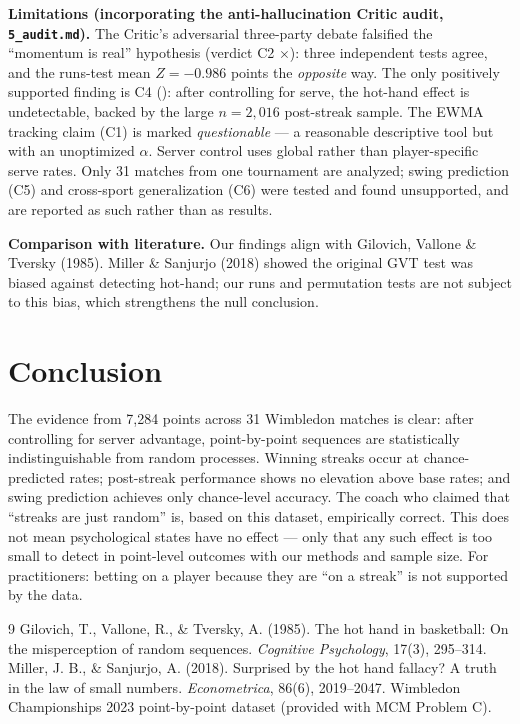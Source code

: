 \documentclass[11pt,a4paper]{article}
\begin{document}
\textbf{Limitations (incorporating the anti-hallucination Critic audit, \texttt{5\_audit.md}).} The Critic's adversarial three-party debate falsified the ``momentum is real'' hypothesis (verdict C2 \(\boldsymbol{\times}\)): three independent tests agree, and the runs-test mean $Z = -0.986$ points the \emph{opposite} way. The only positively supported finding is C4 (\checkmark): after controlling for serve, the hot-hand effect is undetectable, backed by the large $n=2{,}016$ post-streak sample. The EWMA tracking claim (C1) is marked \emph{questionable} --- a reasonable descriptive tool but with an unoptimized $\alpha$. Server control uses global rather than player-specific serve rates. Only 31 matches from one tournament are analyzed; swing prediction (C5) and cross-sport generalization (C6) were tested and found unsupported, and are reported as such rather than as results.

\textbf{Comparison with literature.} Our findings align with Gilovich, Vallone \& Tversky (1985). Miller \& Sanjurjo (2018) showed the original GVT test was biased against detecting hot-hand; our runs and permutation tests are not subject to this bias, which strengthens the null conclusion.

\section{Conclusion}
The evidence from 7{,}284 points across 31 Wimbledon matches is clear: after controlling for server advantage, point-by-point sequences are statistically indistinguishable from random processes. Winning streaks occur at chance-predicted rates; post-streak performance shows no elevation above base rates; and swing prediction achieves only chance-level accuracy. The coach who claimed that ``streaks are just random'' is, based on this dataset, empirically correct. This does not mean psychological states have no effect --- only that any such effect is too small to detect in point-level outcomes with our methods and sample size. For practitioners: betting on a player because they are ``on a streak'' is not supported by the data.

\begin{thebibliography}{9}
 Gilovich, T., Vallone, R., \& Tversky, A. (1985). The hot hand in basketball: On the misperception of random sequences. \emph{Cognitive Psychology}, 17(3), 295--314.
 Miller, J. B., \& Sanjurjo, A. (2018). Surprised by the hot hand fallacy? A truth in the law of small numbers. \emph{Econometrica}, 86(6), 2019--2047.
 Wimbledon Championships 2023 point-by-point dataset (provided with MCM Problem C).
\end{thebibliography}
\end{document}
